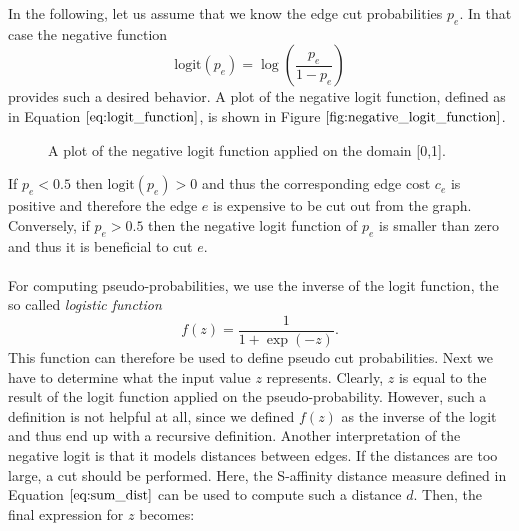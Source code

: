 In the following, let us assume that we know the edge cut probabilities $p_e$. In that case the negative function
\begin{equation}
	\text{logit}\left( p_e \right) = \log \left( \frac{p_e}{1 - p_e} \right)
	\label{eq:logit_function}
\end{equation}
provides such a desired behavior. A plot of the negative logit function, defined as in Equation $\ref{eq:logit_function}$, is shown in Figure $\ref{fig:negative_logit_function}$.
\begin{figure}[H]
\centering
{}
\caption[Logit Function Plot]{A plot of the negative logit function applied on the domain [0,1].}
\label{fig:negative_logit_function}
\end{figure}
If $p_e < 0.5$ then $\text{logit}\left( p_e \right) > 0$ and thus the corresponding edge cost $c_e$ is positive and therefore the edge $e$ is expensive to be cut out from the graph. Conversely, if $p_e > 0.5$ then the negative logit function of $p_e$ is smaller than zero and thus it is beneficial to cut $e$. \\ \\
For computing pseudo-probabilities, we use the inverse of the logit function, the so called \textit{logistic function}
\begin{equation}
	f(z) = \frac{1}{1 + \exp \left( -z \right)}.
	\label{eq:logistic_function}
\end{equation}
This function can therefore be used to define pseudo cut probabilities. Next we have to determine what the input value $z$ represents. Clearly, $z$ is equal to the result of the logit function applied on the pseudo-probability. However, such a definition is not helpful at all, since we defined $f(z)$ as the inverse of the logit and thus end up with a recursive definition. Another interpretation of the negative logit is that it models distances between edges. If the distances are too large, a cut should be performed. Here, the S-affinity distance measure defined in Equation $\ref{eq:sum_dist}$ can be used to compute such a distance $d$. Then, the final expression for $z$ becomes:
